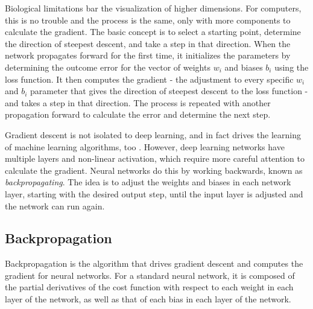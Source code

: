 Biological limitations bar the visualization of higher dimensions.  For computers, this is no trouble and the process is the same, only with more components to calculate the gradient.  The basic concept is to select a starting point, determine the direction of steepest descent, and take a step in that direction.  When the network propagates forward for the first time, it initializes the parameters by determining the outcome error for the vector of weights $w_i$ and biases $b_i$ using the loss function.  It then computes the gradient - the adjustment to every specific $w_i$ and $b_i$ parameter that gives the direction of steepest descent to the loss function - and takes a step in that direction.  The process is repeated with another propagation forward to calculate the error and determine the next step.

Gradient descent is not isolated to deep learning, and in fact drives the learning of machine learning algorithms, too \cite{Goodfellow-et-al-2016}.  However, deep learning networks have multiple layers and non-linear activation, which require more careful attention to calculate the gradient.  Neural networks do this by working backwards, known as \textit{backpropagating}.  The idea is to adjust the weights and biases in each network layer, starting with the desired output step, until the input layer is adjusted and the network can run again.


\hypertarget{backpropagation}{%
\subsection{Backpropagation}\label{backpropagation}}

Backpropagation is the algorithm that drives gradient descent and computes the gradient for neural networks. For a standard neural network, it is composed of the partial derivatives of the cost function with respect to each weight in each layer of the network, as well as that of each bias in each layer of the network.

